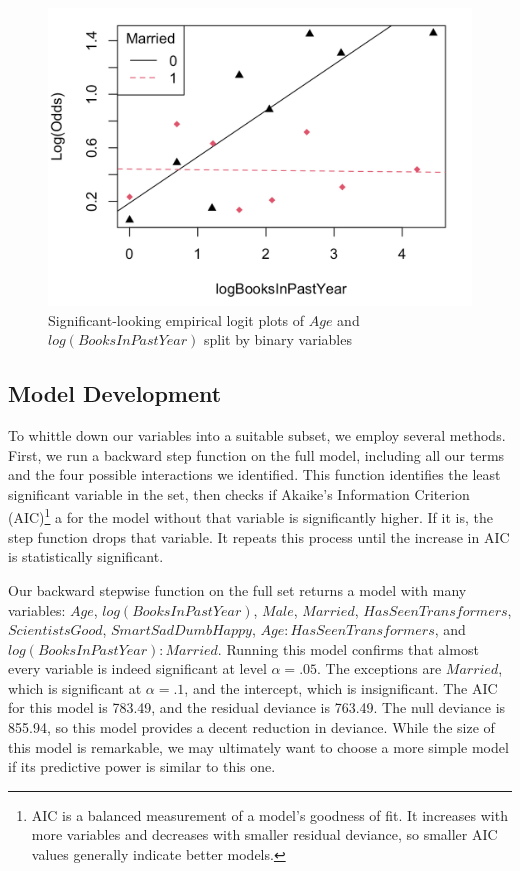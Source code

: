 \begin{figure}[!h]
    \includegraphics[scale=.3]{intxplot_logbooks_married.png}
    \caption{Significant-looking empirical logit plots of $Age$ and $log(BooksInPastYear)$ split by binary variables}
    \label{fig:EDA_intx}
\end{figure}

\newpage

\subsection{Model Development}

\par To whittle down our variables into a suitable subset, we employ several methods. First, we run a backward step function on the full model, including all our terms and the four possible interactions we identified. This function identifies the least significant variable in the set, then checks if  Akaike's Information Criterion (AIC)\footnote{AIC is a balanced measurement of a model's goodness of fit. It increases with more variables and decreases with smaller residual deviance, so smaller AIC values generally indicate better models.} a  for the model without that variable is significantly higher. If it is, the step function drops that variable. It repeats this process until the increase in AIC is statistically significant.

\par \bigskip Our backward stepwise function on the full set returns a model with many variables: $Age$, $log(BooksInPastYear)$, $Male$, $Married$, $HasSeenTransformers$, $ScientistsGood$, $SmartSadDumbHappy$, $Age:HasSeenTransformers$, and $log(BooksInPastYear):Married$. Running this model confirms that almost every variable is indeed significant at level $\alpha = .05$. The exceptions are $Married$, which is significant at $\alpha = .1$, and the intercept, which is insignificant. The AIC for this model is 783.49, and the residual deviance is 763.49. The null deviance is 855.94, so this model provides a decent reduction in deviance. While the size of this model is remarkable, we may ultimately want to choose a more simple model if its predictive power is similar to this one.


